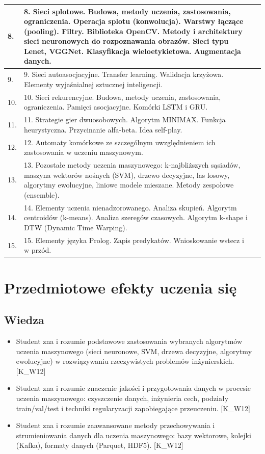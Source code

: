 \documentclass[12pt, a4paper]{article}
\begin{document}
\begin{longtable}{|p{1.5cm}|p{6.5cm}|p{6.5cm}|}
  \hline
  8. & 8. Sieci splotowe. Budowa, metody uczenia, zastosowania, ograniczenia. Operacja splotu (konwolucja). Warstwy łączące (pooling). Filtry.  Biblioteka OpenCV. Metody i architektury sieci neuronowych do rozpoznawania obrazów. Sieci typu Lenet, VGGNet. Klasyfikacja wieloetykietowa. Augmentacja danych. &  \\
  \hline
  9. & 9. Sieci autoasocjacyjne. Transfer learning. Walidacja krzyżowa. Elementy wyjaśnialnej sztucznej inteligencji. &  \\
  \hline
  10. & 10. Sieci rekurencyjne. Budowa, metody uczenia, zastosowania, ograniczenia. Pamięci asocjacyjne. Komórki LSTM i GRU. &  \\
  \hline
  11. & 11. Strategie gier dwuosobowych. Algorytm MINIMAX.  Funkcja heurystyczna. Przycinanie alfa-beta. Idea self-play. &  \\
  \hline
  12. & 12. Automaty komórkowe ze szczególnym uwzględnieniem ich zastosowania w uczeniu maszynowym. &  \\
  \hline
  13. & 13. Pozostałe metody uczenia maszynowego: k-najbliższych sąsiadów, maszyna wektorów nośnych (SVM), drzewo decyzyjne, las losowy, algorytmy ewolucyjne, liniowe modele mieszane. Metody zespołowe (ensemble). &  \\
  \hline
  14. & 14. Elementy uczenia nienadzorowanego. Analiza skupień. Algorytm centroidów (k-means). Analiza szeregów czasowych. Algorytm k-shape i DTW (Dynamic Time Warping). &  \\
  \hline
  15. & 15. Elementy języka Prolog. Zapis predykatów. Wnioskowanie wstecz i w przód. &  \\
  \hline
\end{longtable}

\section{Przedmiotowe efekty uczenia się}

\subsection*{Wiedza}
\begin{itemize}
  \item Student zna i rozumie podstawowe zastosowania wybranych algorytmów uczenia maszynowego (sieci neuronowe, SVM, drzewa decyzyjne, algorytmy ewolucyjne) w rozwiązywaniu rzeczywistych problemów inżynierskich. [K\_W12]
  \item Student zna i rozumie znaczenie jakości i przygotowania danych w procesie uczenia maszynowego: czyszczenie danych, inżynieria cech, podziały train/val/test i techniki regularyzacji zapobiegające przeuczeniu. [K\_W12]
  \item Student zna i rozumie zaawansowane metody przechowywania i strumieniowania danych dla uczenia maszynowego: bazy wektorowe, kolejki (Kafka), formaty danych (Parquet, HDF5). [K\_W12]
\end{itemize}
\end{document}
